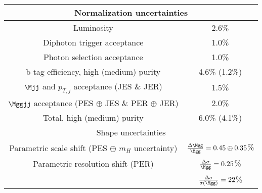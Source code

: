 \begin{tabular}{|c|c|}
\hline
\multicolumn{2}{|c|}{Normalization uncertainties} \\
\hline
Luminosity & 2.6\%\\
Diphoton trigger acceptance & 1.0\% \\
Photon selection acceptance & 1.0\% \\ 
b-tag efficiency, high (medium) purity & 4.6\% (1.2\%) \\  
$\Mjj$ and $p_{T, j}$ acceptance (JES \& JER) & 1.5\%\\
$\Mggjj$ acceptance (PES $\oplus$ JES \& PER  $\oplus$ JER) & 2.0\%\\
\hline
Total, high (medium) purity & 6.0\% (4.1\%) \\
\hline
\hline
\multicolumn{2}{|c|}{Shape uncertainties} \\
\hline
Parametric scale shift (PES $\oplus$ $m_H$ uncertainty)      & $\frac{\Delta\Mgg}{\Mgg} = 0.45 \oplus 0.35$\%\\
Parametric resolution shift (PER) & $\frac{\Delta\sigma}{\Mgg} = 0.25$\% \\
                                  & $\frac{\Delta\sigma}{\sigma(\Mgg)} = 22$\% \\
\hline
\end{tabular}
